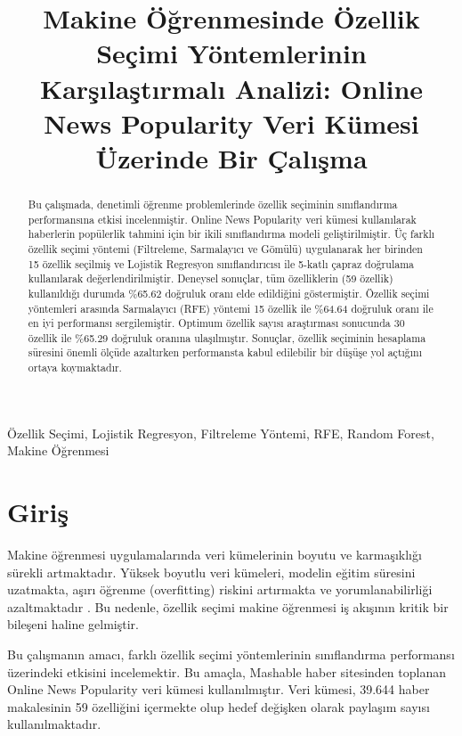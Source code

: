 \documentclass[conference]{IEEEtran}
\title{Makine Öğrenmesinde Özellik Seçimi Yöntemlerinin Karşılaştırmalı Analizi: Online News Popularity Veri Kümesi Üzerinde Bir Çalışma}
\author{
\IEEEauthorblockN{[Ad Soyad]}
\IEEEauthorblockA{[Öğrenci Numarası]\\
Bilgisayar Mühendisliği Bölümü\\
[Üniversite Adı]\\
Email: [email@university.edu]}
}
\begin{document}
\maketitle

\begin{abstract}
Bu çalışmada, denetimli öğrenme problemlerinde özellik seçiminin sınıflandırma performansına etkisi incelenmiştir. Online News Popularity veri kümesi kullanılarak haberlerin popülerlik tahmini için bir ikili sınıflandırma modeli geliştirilmiştir. Üç farklı özellik seçimi yöntemi (Filtreleme, Sarmalayıcı ve Gömülü) uygulanarak her birinden 15 özellik seçilmiş ve Lojistik Regresyon sınıflandırıcısı ile 5-katlı çapraz doğrulama kullanılarak değerlendirilmiştir. Deneysel sonuçlar, tüm özelliklerin (59 özellik) kullanıldığı durumda \%65.62 doğruluk oranı elde edildiğini göstermiştir. Özellik seçimi yöntemleri arasında Sarmalayıcı (RFE) yöntemi 15 özellik ile \%64.64 doğruluk oranı ile en iyi performansı sergilemiştir. Optimum özellik sayısı araştırması sonucunda 30 özellik ile \%65.29 doğruluk oranına ulaşılmıştır. Sonuçlar, özellik seçiminin hesaplama süresini önemli ölçüde azaltırken performansta kabul edilebilir bir düşüşe yol açtığını ortaya koymaktadır.
\end{abstract}

\begin{IEEEkeywords}
Özellik Seçimi, Lojistik Regresyon, Filtreleme Yöntemi, RFE, Random Forest, Makine Öğrenmesi
\end{IEEEkeywords}

\section{Giriş}

Makine öğrenmesi uygulamalarında veri kümelerinin boyutu ve karmaşıklığı sürekli artmaktadır. Yüksek boyutlu veri kümeleri, modelin eğitim süresini uzatmakta, aşırı öğrenme (overfitting) riskini artırmakta ve yorumlanabilirliği azaltmaktadır \cite{guyon2003introduction}. Bu nedenle, özellik seçimi makine öğrenmesi iş akışının kritik bir bileşeni haline gelmiştir.

Bu çalışmanın amacı, farklı özellik seçimi yöntemlerinin sınıflandırma performansı üzerindeki etkisini incelemektir. Bu amaçla, Mashable haber sitesinden toplanan Online News Popularity veri kümesi kullanılmıştır. Veri kümesi, 39.644 haber makalesinin 59 özelliğini içermekte olup hedef değişken olarak paylaşım sayısı kullanılmaktadır.
\end{document}

